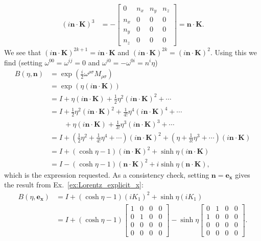 \documentclass[notes.tex]{subfiles}
\begin{document}
\begin{Answer}
\begin{align*}
    (i \mathbf{n} \cdot \mathbf{K})^3 &= - \begin{bmatrix}
        0 & n_x & n_y & n_z \\
        n_x & 0 & 0 & 0 \\
        n_y & 0 & 0 & 0 \\
        n_z & 0 & 0 & 0
    \end{bmatrix} = \mathbf{n}\cdot\mathbf{K}.
\end{align*}
We see that $(i \mathbf{n}\cdot\mathbf{K})^{2k+1}= i \mathbf{n}\cdot\mathbf{K}$ and $(i \mathbf{n}\cdot\mathbf{K})^{2k}=(i \mathbf{n}\cdot\mathbf{K})^2$. Using this we find (setting $\omega^{00}=\omega^{ij}=0$ and $\omega^{i0}=-\omega^{0i}=n^i \eta$)
\begin{align*}
    B(\eta,\mathbf{n}) &= \exp(\frac{i}{2}\omega^{\rho\sigma}M_{\rho\sigma})
    \\
    &= \exp (\eta (i \mathbf{n}\cdot\mathbf{K}) )
    \\
    &= I+\eta(i\mathbf{n}\cdot\mathbf{K})+\frac{1}{2}\eta^2(i\mathbf{n}\cdot\mathbf{K})^2+\cdots
    \\
    &= I+\frac{1}{2}\eta^2(i \mathbf{n}\cdot\mathbf{K})^2+\frac{1}{4!}\eta^4(i\mathbf{n}\cdot\mathbf{K})^4+\cdots
    \\ &\qquad +\eta(i\mathbf{n}\cdot\mathbf{K})+\frac{1}{3!}\eta^3(i\mathbf{n}\cdot\mathbf{K})^3+\cdots
    \\
    &= I + \left(\frac{1}{2}\eta^2+\frac{1}{4!}\eta^4+\cdots\right)(i\mathbf{n}\cdot\mathbf{K})^2+\left(\eta+\frac{1}{3!}\eta^3+\cdots\right)(i\mathbf{n}\cdot\mathbf{K})
    \\
    &= I + (\cosh\eta-1)(i\mathbf{n}\cdot\mathbf{K})^2+\sinh\eta (i\mathbf{n}\cdot\mathbf{K})
    \\
    &= I - (\cosh\eta-1)(\mathbf{n}\cdot\mathbf{K})^2+i\sinh\eta(\mathbf{n}\cdot\mathbf{K}),
\end{align*}
which is the expression requested. As a consistency check, setting $\mathbf{n}=\mathbf{e_x}$ gives the result from Ex.~\ref{ex:Lorentz_explicit_x}:
\begin{align*}
    B(\eta,\mathbf{e_x})&=I+(\cosh\eta-1)(iK_1)^2+\sinh\eta(iK_1)
    \\
    &= I+(\cosh\eta-1)\begin{bmatrix}
        1&0&0&0 \\ 0&1&0&0 \\ 0&0&0&0 \\ 0&0&0&0
    \end{bmatrix} -\sinh\eta \begin{bmatrix}
        0&1&0&0 \\ 1&0&0&0 \\ 0&0&0&0 \\ 0&0&0&0
    \end{bmatrix}.
\end{align*}

\end{Answer}
\end{document}
